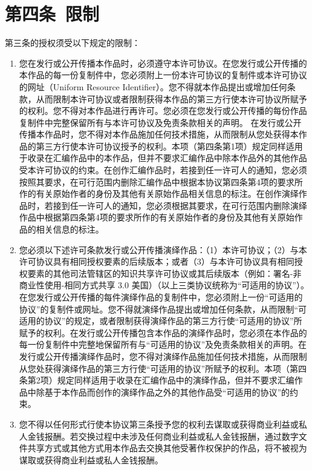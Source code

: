 \section{第四条\ 限制}
第三条的授权须受以下规定的限制： 
\begin{enumerate}
	\item 您在发行或公开传播本作品时，必须遵守本许可协议。在您发行或公开传播的本作品的每一份复制件中，您必须附上一份本许可协议的复制件或本许可协议的网址（Uniform Resource Identifier）。您不得就本作品提出或增加任何条款，从而限制本许可协议或者限制获得本作品的第三方行使本许可协议所赋予的权利。您不得对本作品进行再许可。您必须在您发行或公开传播的每份作品复制件中完整保留所有与本许可协议及免责条款相关的声明。 在发行或公开传播本作品时，您不得对本作品施加任何技术措施，从而限制从您处获得本作品的第三方行使本许可协议授予的权利。本项（第四条第1项）规定同样适用于收录在汇编作品中的本作品，但并不要求汇编作品中除本作品外的其他作品受本许可协议的约束。在创作汇编作品时，若接到任一许可人的通知，您必须按照其要求，在可行范围内删除汇编作品中根据本协议第四条第4项的要求所作的有关原始作者的身份及其他有关原始作品相关信息的标注。在创作演绎作品时，若接到任一许可人的通知，您必须根据其要求，在可行范围内删除演绎作品中根据第四条第4项的要求所作的有关原始作者的身份及其他有关原始作品的相关信息的标注。
	\item 您必须以下述许可条款发行或公开传播演绎作品：（1）本许可协议；（2）与本许可协议具有相同授权要素的后续版本；或者（3）与本许可协议具有相同授权要素的其他司法管辖区的知识共享许可协议或其后续版本（例如：署名-非商业性使用-相同方式共享 3.0 美国）（以上三类协议统称为“可适用的协议”）。在您发行或公开传播的每件演绎作品的复制件中，您必须附上一份“可适用的协议”的复制件或网址。您不得就演绎作品提出或增加任何条款，从而限制“可适用的协议”的规定，或者限制获得演绎作品的第三方行使“可适用的协议”所赋予的权利。在发行或公开传播包含本作品的演绎作品时，您必须在本作品的每一份复制件中完整地保留所有与“可适用的协议”及免责条款相关的声明。在发行或公开传播演绎作品时，您不得对演绎作品施加任何技术措施，从而限制从您处获得演绎作品的第三方行使“可适用的协议”所赋予的权利。本项（第四条第2项）规定同样适用于收录在汇编作品中的演绎作品，但并不要求汇编作品中除基于本作品而创作的演绎作品之外的其他作品受“可适用的协议”的约束。 
	\item 您不得以任何形式行使本协议第三条授予您的权利去谋取或获得商业利益或私人金钱报酬。若交换过程中未涉及任何商业利益或私人金钱报酬，通过数字文件共享方式或其他方式用本作品去交换其他受著作权保护的作品，将不被视为谋取或获得商业利益或私人金钱报酬。

\end{enumerate}
